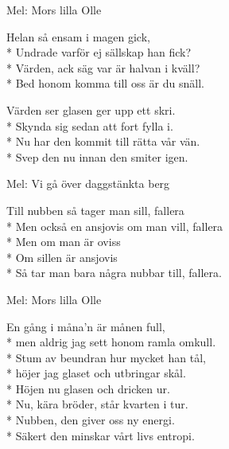 \begin{SongText}[Påfyllningssång]
    \begin{SongInfo}
        Mel: Mors lilla Olle
    \end{SongInfo}
    \begin{SongVerse}
        Helan så ensam i magen gick,\\*%
        Undrade varför ej sällskap han fick?\\*%
        Värden, ack säg var är halvan i kväll?\\*%
        Bed honom komma till oss är du snäll.
    \end{SongVerse}
    \begin{SongVerse}
        Värden ser glasen ger upp ett skri.\\*%
        Skynda sig sedan att fort fylla i.\\*%
        Nu har den kommit till rätta vår vän.\\*%
        Svep den nu innan den smiter igen.
    \end{SongVerse}
\end{SongText}
\begin{SongText}
    \begin{SongInfo}
        Mel: Vi gå över daggstänkta berg
    \end{SongInfo}
    \begin{SongVerse}
        Till nubben så tager man sill, fallera\\*%
        Men också en ansjovis om man vill, fallera\\*%
        Men om man är oviss\\*%
        Om sillen är ansjovis\\*%
        Så tar man bara några nubbar till, fallera.
    \end{SongVerse}
\end{SongText}
\begin{SongText}
    \begin{SongInfo}
        Mel: Mors lilla Olle
    \end{SongInfo}
    \begin{SongVerse}
        En gång i måna’n är månen full,\\*%
        men aldrig jag sett honom ramla omkull.\\*%
        Stum av beundran hur mycket han tål,\\*%
        höjer jag glaset och utbringar skål.\\*%
        Höjen nu glasen och dricken ur.\\*%
        Nu, kära bröder, står kvarten i tur.\\*%
        Nubben, den giver oss ny energi.\\*%
        Säkert den minskar vårt livs entropi.
    \end{SongVerse}
\end{SongText}
